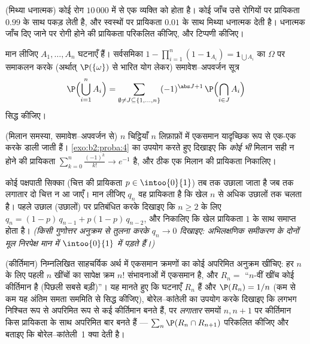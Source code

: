 \begin{exercise}[$\star$]\label{exo:b2:proba:3}
(मिथ्या धनात्मक) कोई रोग $10\,000$ में से एक व्यक्ति को होता है। कोई
जाँच उसे रोगियों पर प्रायिकता $0.99$ के साथ पकड़ लेती है, और स्वस्थों
पर प्रायिकता $0.01$ के साथ मिथ्या धनात्मक देती है। धनात्मक जाँच दिए
जाने पर रोगी होने की प्रायिकता परिकलित कीजिए, और टिप्पणी कीजिए।
\end{exercise}

\begin{exercise}[$\star\star$]\label{exo:b2:proba:4}
मान लीजिए $A_1, \dots, A_n$ घटनाएँ हैं। सर्वसमिका $1 - \prod_{i=1}^n(1 -
\mathbf{1}_{A_i}) = \mathbf{1}_{\bigcup A_i}$ का $\Omega$ पर समाकलन करके
(अर्थात् $\P(\{\omega\})$ से भारित योग लेकर) समावेश--अपवर्जन सूत्र
\[
\P\Bigl(\bigcup_{i=1}^n A_i\Bigr)
= \sum_{\emptyset \neq J \subseteq \{1,\dots,n\}}
(-1)^{\abs J + 1}\,\P\Bigl(\bigcap_{i \in J}A_i\Bigr)
\]
सिद्ध कीजिए।
\end{exercise}

\begin{exercise}[$\star\star$]\label{exo:b2:proba:5}
(मिलान समस्या, समावेश--अपवर्जन से) $n$ चिट्ठियाँ $n$ लिफ़ाफ़ों में
एकसमान यादृच्छिक रूप से एक-एक करके डाली जाती हैं। \cref{exo:b2:proba:4} का उपयोग
करते हुए दिखाइए कि \emph{कोई भी} मिलान सही न होने की प्रायिकता $\sum_{k=0}^n \frac{(-1)^k}{k!} \to e^{-1}$
है, और ठीक एक मिलान की प्रायिकता निकालिए।
\end{exercise}

\begin{exercise}[$\star\star$]\label{exo:b2:proba:6}
कोई पक्षपाती सिक्का (चित्त की प्रायिकता $p \in \intoo{0}{1}$) तब तक उछाला जाता है
जब तक लगातार दो चित्त न आ जाएँ। मान लीजिए $q_n$ वह प्रायिकता है कि
खेल $n$ से अधिक उछालों तक चलता है। पहले उछाल (उछालों) पर
प्रतिबंधित करके दिखाइए कि $n \geq 2$ के लिए $q_n = (1-p)\,q_{n-1} + p(1-p)\,q_{n-2}$, और निकालिए कि खेल
प्रायिकता $1$ के साथ समाप्त होता है। \emph{(किसी गुणोत्तर अनुक्रम
से तुलना करके $q_n \to 0$ दिखाइए: अभिलक्षणिक समीकरण के दोनों मूल निरपेक्ष
मान में $\intoo{0}{1}$ में पड़ते हैं।)}
\end{exercise}

\begin{exercise}[$\star\star\star$]\label{exo:b2:proba:7}
(कीर्तिमान) निम्नलिखित साहचर्यिक अर्थ में  एकसमान क्रमणों
का कोई अपरिमित अनुक्रम खींचिए: हर $n$ के लिए पहली $n$ खींचों का
सापेक्ष क्रम $n!$ संभावनाओं में एकसमान है, और $R_n = {}$ ``$n$-वीं खींच
कोई कीर्तिमान है (पिछली सबसे बड़ी)''। यह मानते हुए कि घटनाएँ $R_n$
 हैं और $\P(R_n) = 1/n$ (कम से कम यह अंतिम समता सममिति से सिद्ध कीजिए),
बोरेल--कांतेली का उपयोग करके दिखाइए कि लगभग निश्चित रूप से अपरिमित
रूप से कई कीर्तिमान बनते हैं, पर \emph{लगातार} समयों $n, n+1$ पर
कीर्तिमान किस प्रायिकता के साथ अपरिमित बार बनते हैं --- $\sum_n \P(R_n \cap R_{n+1})$
परिकलित कीजिए और बताइए कि बोरेल--कांतेली~1 क्या देती है।
\end{exercise}

